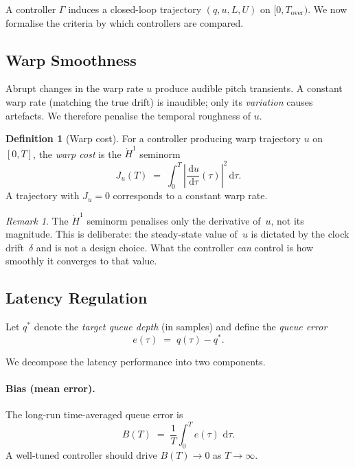 \documentclass[11pt, a4paper]{article}
\theoremstyle{definition}
\newtheorem{definition}{Definition}[section]
\theoremstyle{plain}
\theoremstyle{remark}
\newtheorem{remark}{Remark}[section]
\newcommand{\dd}{\,\mathrm{d}}                   %
\begin{document}
A controller $\Gamma$ induces a closed-loop trajectory
$(q, u, L, U)$ on $[0, T_{\text{over}})$.
We now formalise the criteria by which controllers are compared.

\subsection{Warp Smoothness}\label{sec:warp-smooth}

Abrupt changes in the warp rate $u$ produce audible pitch
transients.  A constant warp rate (matching the true drift)
is inaudible; only its \emph{variation} causes artefacts.
We therefore penalise the temporal roughness of $u$.

\begin{definition}[Warp cost]\label{def:warp-cost}
  For a controller producing warp trajectory $u$ on $[0, T]$,
  the \emph{warp cost} is the $\dot{H}^1$ seminorm
  \begin{equation}\label{eq:warp-cost}
    J_u(T) \;=\; \int_0^{T}\!
      \left|\frac{\dd u}{\dd \tau}(\tau)\right|^2 \dd\tau.
  \end{equation}
  A trajectory with $J_u = 0$ corresponds to a constant warp rate.
\end{definition}

\begin{remark}
  The $\dot{H}^1$ seminorm penalises only the derivative of~$u$,
  not its magnitude.  This is deliberate: the steady-state value
  of~$u$ is dictated by the clock drift~$\delta$ and is not a
  design choice.  What the controller \emph{can} control is how
  smoothly it converges to that value.
\end{remark}

\subsection{Latency Regulation}\label{sec:latency-obj}

Let $q^*$ denote the \emph{target queue depth} (in samples) and
define the \emph{queue error}
\begin{equation}\label{eq:queue-error}
  e(\tau) \;=\; q(\tau) - q^*.
\end{equation}

We decompose the latency performance into two components.

\paragraph{Bias (mean error).}
The long-run time-averaged queue error is
\begin{equation}\label{eq:bias}
  B(T) \;=\; \frac{1}{T}\int_0^{T} e(\tau)\,\dd\tau.
\end{equation}
A well-tuned controller should drive $B(T) \to 0$ as $T \to \infty$.
\end{document}
